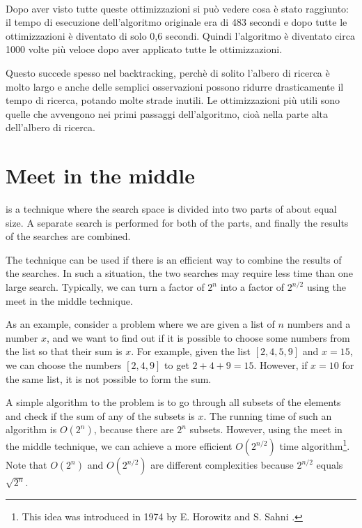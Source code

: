 ~\\
Dopo aver visto tutte queste ottimizzazioni
si può vedere cosa è stato raggiunto: il
tempo di esecuzione dell'algoritmo originale era di
483 secondi e dopo tutte le ottimizzazioni è diventato di
solo 0,6 secondi. Quindi l'algoritmo è diventato circa 
1000 volte più veloce dopo aver applicato tutte le ottimizzazioni.

Questo succede spesso nel backtracking,
perchè di solito l'albero di ricerca è molto
largo e anche delle semplici osservazioni
possono ridurre drasticamente il tempo di ricerca,
potando molte strade inutili.
Le ottimizzazioni più utili sono quelle che avvengono 
nei primi passaggi dell'algoritmo, cioà nella parte alta 
dell'albero di ricerca.

\section{Meet in the middle}


 is a technique
where the search space is divided into
two parts of about equal size.
A separate search is performed
for both of the parts,
and finally the results of the searches are combined.

The technique can be used
if there is an efficient way to combine the
results of the searches.
In such a situation, the two searches may require less
time than one large search.
Typically, we can turn a factor of $2^n$
into a factor of $2^{n/2}$ using the meet in the
middle technique.

As an example, consider a problem where
we are given a list of $n$ numbers and
a number $x$,
and we want to find out if it is possible
to choose some numbers from the list so that
their sum is $x$.
For example, given the list $[2,4,5,9]$ and $x=15$,
we can choose the numbers $[2,4,9]$ to get $2+4+9=15$.
However, if $x=10$ for the same list,
it is not possible to form the sum.

A simple algorithm to the problem is to
go through all subsets of the elements and
check if the sum of any of the subsets is $x$.
The running time of such an algorithm is $O(2^n)$,
because there are $2^n$ subsets.
However, using the meet in the middle technique,
we can achieve a more efficient $O(2^{n/2})$ time algorithm\footnote{This
idea was introduced in 1974 by E. Horowitz and S. Sahni \cite{hor74}.}.
Note that $O(2^n)$ and $O(2^{n/2})$ are different
complexities because $2^{n/2}$ equals $\sqrt{2^n}$.

